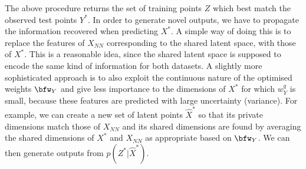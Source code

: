 \par The above procedure returns the set of training points $Z$ which best match the observed test points $Y^*$.
In order to generate novel outputs, we have to propagate the information recovered when predicting $X^*$. 
A simple way of doing this is to replace the features of $X_{NN}$ corresponding to the shared latent space,
 with those of $X^*$. This is a reasonable idea, since the shared latent space is supposed to encode the same
 kind of information for both datasets.
 A slightly more sophisticated approach is to also exploit the continuous nature of the
 optimised weights $\bfw_Y$ and give less importance to the dimensions of $X^*$ for which $w_Y^q$ is small,
 because these features are predicted with large uncertainty (variance).
 For example, we can create a new set of latent points $\hat{X}^{*}$ so that its private dimensions match those
 of $X_{NN}$ and its shared dimensions are found by averaging  
the shared dimensions of $X^*$ and $X_{NN}$ 
 as appropriate based on $\bfw_Y$. We can then generate outputs from $p(Z^* | \hat{X}^{*})$.

